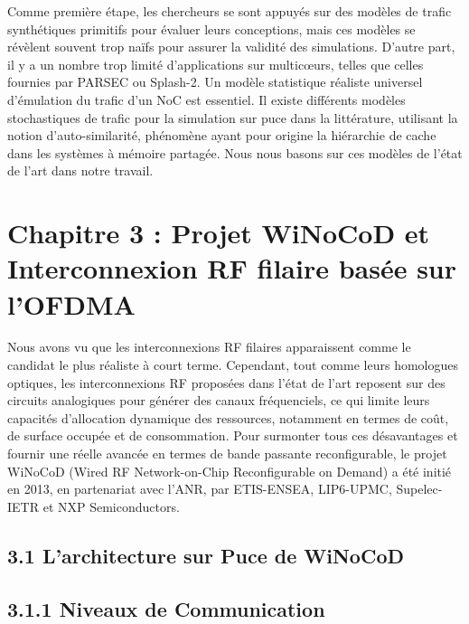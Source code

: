 Comme première étape, les chercheurs se sont appuyés sur des modèles de trafic synthétiques primitifs pour évaluer leurs conceptions, mais ces modèles se révèlent souvent trop naïfs pour assurer la validité des simulations. D’autre part, il y a un nombre trop limité d'applications sur multicœurs, telles que celles fournies par PARSEC ou Splash-2. Un modèle statistique réaliste universel d’émulation du trafic d’un NoC est essentiel. Il existe différents modèles stochastiques de trafic pour la simulation sur puce dans la littérature, utilisant la notion d'auto-similarité, phénomène ayant pour origine la hiérarchie de cache dans les systèmes à mémoire partagée. Nous nous basons sur ces modèles de l'état de l'art dans notre travail.

\section*{Chapitre 3 : Projet WiNoCoD et Interconnexion RF filaire basée sur l’OFDMA}

Nous avons vu que les interconnexions RF filaires apparaissent comme le candidat le plus réaliste à court terme. Cependant, tout comme leurs homologues optiques, les interconnexions RF proposées dans l’état de l'art reposent sur des circuits analogiques pour générer des canaux fréquenciels, ce qui limite leurs capacités d'allocation dynamique des ressources, notamment en termes de coût, de surface occupée et de consommation. Pour surmonter tous ces désavantages et fournir une réelle avancée en termes de bande passante reconfigurable, le projet WiNoCoD (Wired RF Network-on-Chip Reconfigurable on Demand) a été initié en 2013, en partenariat avec l'ANR, par ETIS-ENSEA, LIP6-UPMC, Supelec-IETR et NXP Semiconductors.

\subsection*{3.1 L'architecture sur Puce de WiNoCoD}
\subsection*{3.1.1 Niveaux de Communication}

